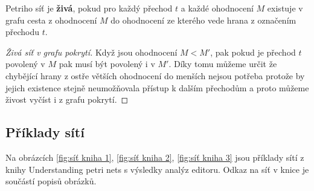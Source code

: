 \documentclass[
  biblatex,
  glossaries,
]{kidiplom}
\begin{document}
Petriho síť je \textbf{živá}, pokud 
pro každý přechod $t$ a každé ohodnocení $M$ existuje v grafu cesta
z ohodnocení $M$ do ohodnocení ze kterého vede hrana z označením přechodu $t$.
\begin{proof}[Živá síť v grafu pokrytí]
 Když jsou ohodnocení $M < M'$, pak pokud je přechod $t$ 
  povolený v $M$ pak musí být povolený i v $M'$. Díky tomu můžeme určit
  že chybějící hrany z ostře větších ohodnocení do menších nejsou potřeba protože 
  by jejich existence stejně neumožňovala přístup k dalším přechodům a proto můžeme 
  živost vyčíst i z grafu pokrytí.
\end{proof}


\subsection{Příklady sítí}
Na obrázcích \ref{fig:síť kniha 1}, \ref{fig:síť kniha 2}, \ref{fig:síť kniha 3} jsou příklady sítí z knihy Understanding petri nets\cite{reisig2013understanding} 
s výsledky analýz editoru.
Odkaz na síť v knice je součástí popisů obrázků.
\end{document}
